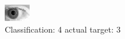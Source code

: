 \begin{figure}[h!]
\begin{center}
\includegraphics[width=0.60\columnwidth]{figures/ID237_class_4_target_3.png}
\end{center}
\caption{ Classification: 4 actual target: 3}
\label{fig:ID237_class_4_target_3}
\end{figure}
